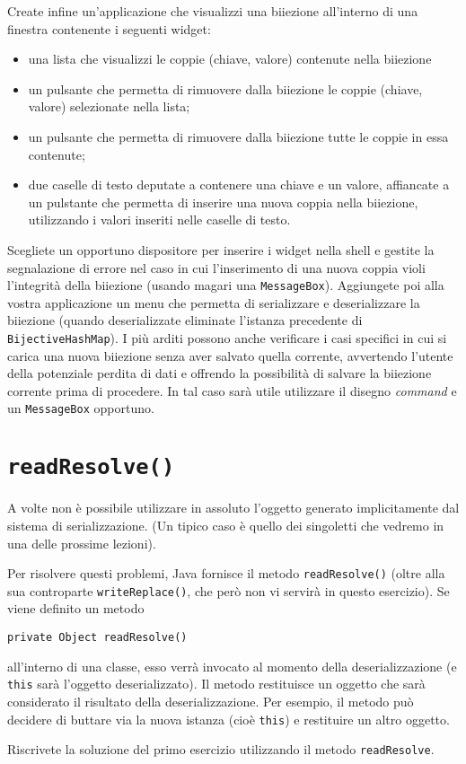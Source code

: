 \documentclass{article}
\begin{document}
Create infine un'applicazione che visualizzi una biiezione all'interno di una finestra contenente i seguenti widget:

\begin{itemize}
\item una lista che visualizzi le coppie (chiave, valore) contenute nella biiezione
\item un pulsante che permetta di rimuovere dalla biiezione le coppie (chiave, valore) selezionate nella lista;
\item un pulsante che permetta di rimuovere dalla biiezione tutte le coppie in essa contenute;
\item due caselle di testo deputate a contenere una chiave e un valore, affiancate a un pulstante che permetta di inserire una nuova coppia nella biiezione, utilizzando i valori inseriti nelle caselle di testo.
\end{itemize}

Scegliete un opportuno dispositore per inserire i widget nella shell e gestite la segnalazione di errore nel caso in cui l'inserimento di una nuova coppia violi l'integrit\`a della biiezione (usando magari una \texttt{MessageBox}). Aggiungete poi alla vostra applicazione un menu che permetta di serializzare e deserializzare la biiezione (quando deserializzate eliminate l'istanza precedente di \texttt{BijectiveHashMap}). I pi\`u arditi possono anche verificare i casi specifici in cui si carica una nuova biiezione senza aver salvato quella corrente, avvertendo l'utente della potenziale perdita di dati e offrendo la possibilit\`a di salvare la biiezione corrente prima di procedere. In tal caso sar\`a utile utilizzare il  disegno \emph{command} e un \texttt{MessageBox} opportuno.

\section*{\texttt{readResolve()}}

A volte non \`e possibile utilizzare in assoluto l'oggetto generato implicitamente dal sistema di serializzazione. (Un tipico caso \`e quello dei singoletti che vedremo in una delle prossime lezioni).

Per risolvere questi problemi, Java fornisce il metodo \texttt{readResolve()} (oltre alla sua controparte \texttt{writeReplace()}, che per\`o non vi servir\`a in questo esercizio). Se viene definito un metodo
\begin{verbatim}
private Object readResolve()
\end{verbatim}
all'interno di una classe, esso verr\`a invocato al momento della deserializzazione (e \texttt{this} sar\`a l'oggetto deserializzato). Il metodo restituisce un oggetto che sar\`a considerato il risultato della deserializzazione. Per esempio, il metodo pu\`o decidere di buttare via la nuova istanza (cio\`e \texttt{this}) e restituire un altro oggetto.


Riscrivete la soluzione del primo esercizio utilizzando il metodo \texttt{readResolve}.
\end{document}
